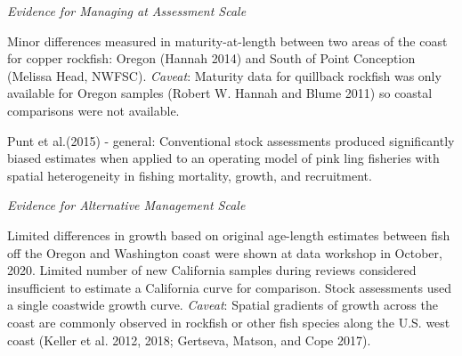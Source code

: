 \documentclass[11pt,
  english,
  letterpaper,
]{article}
\begin{document}
\leavevmode\tagmcend\tagstructend


\emph{Evidence for Managing at Assessment Scale}

\leavevmode\tagmcend\tagstructend\par


Minor differences measured in maturity-at-length between two areas of the coast for copper rockfish: Oregon {(Hannah 2014)\leavevmode\tagmcend\tagstructend} and South of Point Conception (Melissa Head, NWFSC). \emph{Caveat}: Maturity data for quillback rockfish was only available for Oregon samples {(Robert W. Hannah and Blume 2011)\leavevmode\tagmcend\tagstructend} so coastal comparisons were not available.

\leavevmode\tagmcend\tagstructend\par


Punt et al.{(2015)\leavevmode\tagmcend\tagstructend} - general: Conventional stock assessments produced significantly biased estimates when applied to an operating model of pink ling fisheries with spatial heterogeneity in fishing mortality, growth, and recruitment.

\leavevmode\tagmcend\tagstructend\par


\emph{Evidence for Alternative Management Scale}

\leavevmode\tagmcend\tagstructend\par


Limited differences in growth based on original age-length estimates between fish off the Oregon and Washington coast were shown at data workshop in October, 2020. Limited number of new California samples during reviews considered insufficient to estimate a California curve for comparison. Stock assessments used a single coastwide growth curve. \emph{Caveat}: Spatial gradients of growth across the coast are commonly observed in rockfish or other fish species along the U.S. west coast {(Keller et al. 2012, 2018; Gertseva, Matson, and Cope 2017)\leavevmode\tagmcend\tagstructend}.
\end{document}
